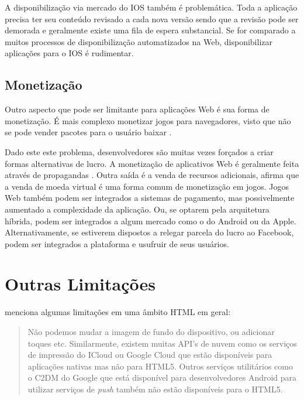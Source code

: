 A disponibilização via mercado do IOS também é problemática.
Toda a aplicação precisa ter seu conteúdo revisado a cada nova
versão sendo que a revisão pode ser demorada e geralmente existe uma
fila de espera substancial. Se for comparado a muitos processos de
disponibilização automatizados na Web, disponibilizar aplicações
para o IOS é rudimentar.

\subsection{Monetização}

Outro aspecto que pode ser limitante para aplicações Web é sua forma
de monetização. É mais complexo monetizar jogos para navegadores,
visto que não se pode vender pacotes para o usuário baixar
\textsc{\autocite[p. 44]{gameCommunities}}.

Dado este este problema, desenvolvedores são muitas vezes forçados
a criar formas alternativas de lucro. A monetização de aplicativos
Web é geralmente feita através de propagandas \autocite[p.
44]{gameCommunities}. Outra saída é a venda de recursos adicionais,
\citet[p. 44]{gameCommunities} afirma que a venda de moeda virtual
é uma forma comum de monetização em jogos. Jogos Web também podem ser
integrados a sistemas de pagamento, mas possivelmente aumentado a
complexidade da aplicação. Ou, se optarem pela arquitetura híbrida,
podem ser integrados a algum mercado como o do Android ou da Apple.
Alternativamente, se estiverem dispostos a relegar parcela do lucro
ao Facebook, podem ser integrados a plataforma e usufruir de seus
usuários.

\section{Outras Limitações}

\citet{html5Tradeoffs} menciona algumas limitações em uma âmbito HTML em geral:

\begin{quote}
Não podemos mudar a imagem de fundo do dispositivo, ou adicionar toques
etc. Similarmente, existem muitas API's de nuvem como os serviços
de impressão do ICloud ou Google Cloud que estão disponíveis para
aplicações nativas mas não para HTML5. Outros serviços utilitários
como o C2DM do Google que está disponível para desenvolvedores Android
para utilizar serviços de \textit{push} também não estão disponíveis
para o HTML5.
\end{quote}

